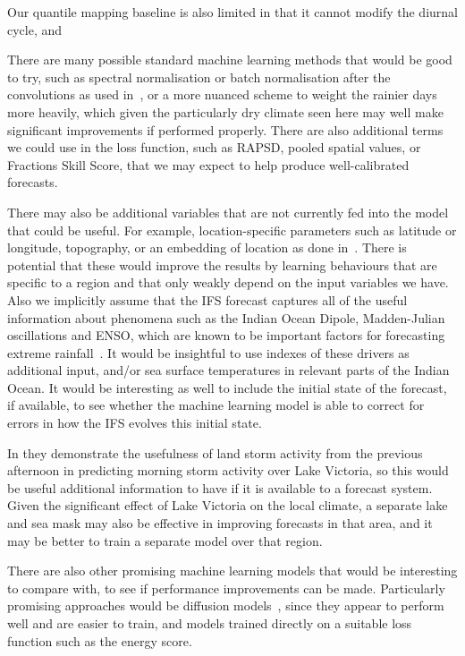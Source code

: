 \documentclass{article}
\begin{document}
Our quantile mapping baseline is also limited in that it cannot modify the diurnal cycle, and 

There are many possible standard machine learning methods that would be good to try, such as spectral normalisation or batch normalisation after the convolutions as used in~\cite{ravuri_skilful_2021}, or a more nuanced scheme to weight the rainier days more heavily, which given the particularly dry climate seen here may well make significant improvements if performed properly. There are also additional terms we could use in the loss function, such as RAPSD, pooled spatial values, or Fractions Skill Score, that we may expect to help produce well-calibrated forecasts.

There may also be additional variables that are not currently fed into the model that could be useful. For example, location-specific parameters such as latitude or longitude, topography, or an embedding of location as done in~\cite{rasp_neural_2018}. There is potential that these would improve the results by learning behaviours that are specific to a region and that only weakly depend on the input variables we have. Also we implicitly assume that the IFS forecast captures all of the useful information about phenomena such as the Indian Ocean Dipole, Madden-Julian oscillations and ENSO, which are known to be important factors for forecasting extreme rainfall~\citep{wainwright_extreme_2021, palmer_drivers_2023}. It would be insightful to use indexes of these drivers as additional input, and/or sea surface temperatures in relevant parts of the Indian Ocean. It would be interesting as well to include the initial state of the forecast, if available, to see whether the machine learning model is able to correct for errors in how the IFS evolves this initial state.


In \cite{thiery_early_2017} they demonstrate the usefulness of land storm activity from the previous afternoon in predicting morning storm activity over Lake Victoria, so this would be useful additional information to have if it is available to a forecast system. Given the significant effect of Lake Victoria on the local climate, a separate lake and sea mask may also be effective in improving forecasts in that area, and it may be better to train a separate model over that region.

There are also other promising machine learning models that would be interesting to compare with, to see if performance improvements can be made. Particularly promising approaches would be diffusion models~\citep{addison_machine_2022}, since they appear to perform well and are easier to train, and models trained directly on a suitable loss function such as the energy score.
\end{document}
